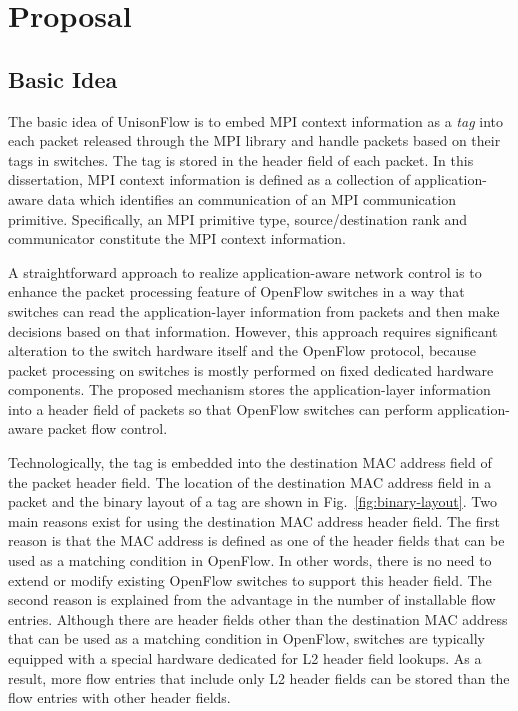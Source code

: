 \section{Proposal}\label{sec:iv-proposal}

\subsection{Basic Idea}\label{sec:iv-basic-idea}

The basic idea of UnisonFlow is to embed MPI context information as a
\emph{tag} into each packet released through the MPI library and handle
packets based on their tags in switches. The tag is stored in the header
field of each packet. In this dissertation, MPI context information is defined
as a collection of application-aware data which identifies an
communication of an MPI communication primitive. Specifically, an MPI
primitive type, source/destination rank and communicator constitute the MPI
context information.

A straightforward approach to realize application-aware network control
is to enhance the packet processing feature of OpenFlow switches in a
way that switches can read the application-layer information from packets
and then make decisions based on that information. However, this
approach requires significant alteration to the switch hardware itself
and the OpenFlow protocol, because packet processing on switches is
mostly performed on fixed dedicated hardware components. The proposed
mechanism stores the application-layer information into a header field of
packets so that OpenFlow switches can perform application-aware packet
flow control.

Technologically, the tag is embedded into the destination MAC address field of
the packet header field. The location of the destination MAC address
field in a packet and the binary layout of a tag are shown in
Fig.~\ref{fig:binary-layout}.
Two main reasons exist for using the destination MAC address header
field. The first reason is that the MAC address is defined as one of the
header fields that can be used as a matching condition in OpenFlow. In other
words, there is no need to extend or modify existing OpenFlow
switches to support this header field. The second reason is explained
from the advantage in the number of installable flow entries. Although
there are header fields other than the destination MAC address that can
be used as a matching condition in OpenFlow, switches are typically
equipped with a special hardware dedicated for L2 header field lookups.
As a result, more flow entries that include only L2 header fields can be
stored than the flow entries with other header fields.


